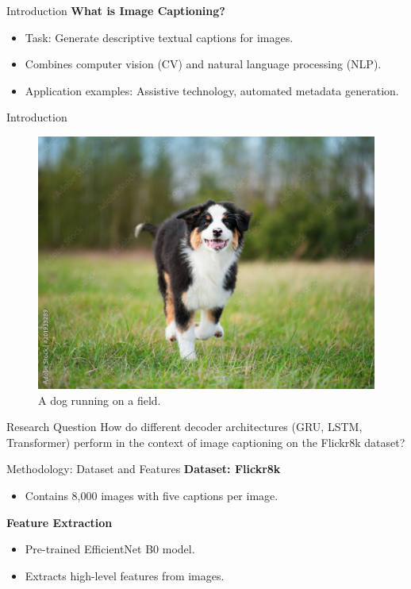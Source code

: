 \documentclass[10pt]{beamer}
\institute{Universit\"at Hamburg\\\trinstitute}
\title{\trtitle}
\subtitle{\trtype}
\author{\trauthor}
\date{}
\theoremstyle{remark}
\begin{document}
\renewcommand{\arraystretch}{1.2}

\begin{frame}[plain]
  \titlepage
\end{frame}


\begin{frame}{Introduction}
	\textbf{What is Image Captioning?}
	\begin{itemize}
			\item Task: Generate descriptive textual captions for images.
			\item Combines computer vision (CV) and natural language processing (NLP).
			\item Application examples: Assistive technology, automated metadata generation.
	\end{itemize}
\end{frame}

\begin{frame}{Introduction}
	\begin{figure}[H]
		\includegraphics[width=.6\textwidth]{res/dog.jpg}
		\caption{A dog running on a field.}\label{fig:dog}
	\end{figure}
\end{frame}

\begin{frame}{Research Question}
	How do different decoder architectures (GRU, LSTM, Transformer) perform in the context of image captioning on the Flickr8k dataset?
\end{frame}

\begin{frame}{Methodology: Dataset and Features}
	\textbf{Dataset: Flickr8k}
	\begin{itemize}
			\item Contains 8,000 images with five captions per image.
	\end{itemize}
	\textbf{Feature Extraction}
	\begin{itemize}
			\item Pre-trained EfficientNet B0 model.
			\item Extracts high-level features from images.
	\end{itemize}
\end{frame}
\end{document}
